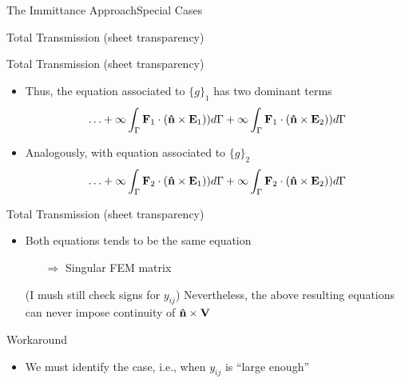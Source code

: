\begin{frame}[allowframebreaks]{The Immittance Approach}{Special Cases}
\begin{block}{Total Transmission (sheet transparency)}
\begin{itemize}
    \end{itemize}
  \end{block}
  
  \framebreak  %

  \begin{block}{Total Transmission (sheet transparency)}
    \begin{itemize}
    
  \item Thus, the equation associated to $\lbrace g\rbrace_1$ has
      two dominant terms 
%      
      \begin{equation*}
        \ldots + \infty \int_{\Gamma} \mathbf{F}_1\cdot(\mathbf{\hat{n}}  \times \mathbf{E}_1 )) d\Gamma
        + \infty \int_{\Gamma} \mathbf{F}_1\cdot(\mathbf{\hat{n}}  \times \mathbf{E}_2 )) d\Gamma
      \end{equation*}
      
    \item Analogously, with equation associated to
      $\lbrace g\rbrace_2$
      \begin{equation*}
        \ldots + \infty \int_{\Gamma} \mathbf{F}_2\cdot(\mathbf{\hat{n}}  \times \mathbf{E}_1 )) d\Gamma
        + \infty \int_{\Gamma} \mathbf{F}_2\cdot(\mathbf{\hat{n}}  \times \mathbf{E}_2 )) d\Gamma
      \end{equation*}
      
    \end{itemize}
  \end{block}

  \begin{alertblock}{Total Transmission (sheet transparency)}%
    \begin{itemize}
    \item Both equations tends to be the same equation
      \begin{itemize}
      \item[$\Rightarrow$] Singular FEM matrix
      \end{itemize}
      \alert{(I mush still check signs for $y_{ij}$) } Nevertheless,
      the above resulting equations can never impose continuity of
      $\mathbf{\hat{n}}\times\mathbf{V}$
    \end{itemize}
  \end{alertblock}
  
  \framebreak  %

  \begin{block}{%
      Workaround}
    \begin{itemize}
    \item We must identify the case, i.e., when $y_{ij}$ is
      \alert{``large enough''}
      

\end{itemize}
\end{block}
\end{frame}
